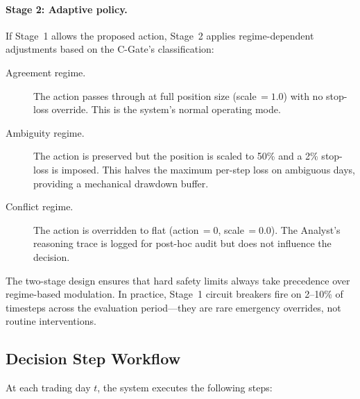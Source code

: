 \paragraph{Stage 2: Adaptive policy.}
If Stage~1 allows the proposed action, Stage~2 applies regime-dependent
adjustments based on the C-Gate's classification:

\begin{description}
  \item[Agreement regime.] The action passes through at full position size
    (scale$\,= 1.0$) with no stop-loss override. This is the system's
    normal operating mode.
  \item[Ambiguity regime.] The action is preserved but the position is
    scaled to 50\% and a 2\% stop-loss is imposed. This halves the
    maximum per-step loss on ambiguous days, providing a mechanical
    drawdown buffer.
  \item[Conflict regime.] The action is overridden to flat
    (action$\,= 0$, scale$\,= 0.0$). The Analyst's reasoning trace is
    logged for post-hoc audit but does not influence the decision.
\end{description}

The two-stage design ensures that hard safety limits always take precedence
over regime-based modulation. In practice, Stage~1 circuit breakers fire
on 2--10\% of timesteps across the evaluation period---they are rare
emergency overrides, not routine interventions.


\subsection{Decision Step Workflow}
\label{sec:decision-workflow}

At each trading day $t$, the system executes the following steps:

